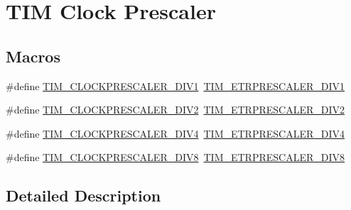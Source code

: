 \hypertarget{group___t_i_m___clock___prescaler}{\section{T\-I\-M Clock Prescaler}
\label{group___t_i_m___clock___prescaler}
}
\subsection*{Macros}
\begin{DoxyCompactItemize}
\item 
\#define \hyperlink{group___t_i_m___clock___prescaler_ga3462b444a059f001c6df33f55c756313}{T\-I\-M\-\_\-\-C\-L\-O\-C\-K\-P\-R\-E\-S\-C\-A\-L\-E\-R\-\_\-\-D\-I\-V1}~\hyperlink{group___t_i_m___e_t_r___prescaler_gabead5364c62645592e42545ba09ab88a}{T\-I\-M\-\_\-\-E\-T\-R\-P\-R\-E\-S\-C\-A\-L\-E\-R\-\_\-\-D\-I\-V1}
\item 
\#define \hyperlink{group___t_i_m___clock___prescaler_gac6457751c882644727982fda1fd029a5}{T\-I\-M\-\_\-\-C\-L\-O\-C\-K\-P\-R\-E\-S\-C\-A\-L\-E\-R\-\_\-\-D\-I\-V2}~\hyperlink{group___t_i_m___e_t_r___prescaler_gaf7fe49f67bdb6b33b9b41953fee75680}{T\-I\-M\-\_\-\-E\-T\-R\-P\-R\-E\-S\-C\-A\-L\-E\-R\-\_\-\-D\-I\-V2}
\item 
\#define \hyperlink{group___t_i_m___clock___prescaler_ga11ce3686a0ee934384d0e4651823883d}{T\-I\-M\-\_\-\-C\-L\-O\-C\-K\-P\-R\-E\-S\-C\-A\-L\-E\-R\-\_\-\-D\-I\-V4}~\hyperlink{group___t_i_m___e_t_r___prescaler_gaa09da30c3cd28f1fe6b6f3f599a5212c}{T\-I\-M\-\_\-\-E\-T\-R\-P\-R\-E\-S\-C\-A\-L\-E\-R\-\_\-\-D\-I\-V4}
\item 
\#define \hyperlink{group___t_i_m___clock___prescaler_ga86f147be5654631b21aa391a001401d5}{T\-I\-M\-\_\-\-C\-L\-O\-C\-K\-P\-R\-E\-S\-C\-A\-L\-E\-R\-\_\-\-D\-I\-V8}~\hyperlink{group___t_i_m___e_t_r___prescaler_ga834e38200874cced108379b17a24d0b7}{T\-I\-M\-\_\-\-E\-T\-R\-P\-R\-E\-S\-C\-A\-L\-E\-R\-\_\-\-D\-I\-V8}
\end{DoxyCompactItemize}


\subsection{Detailed Description}


